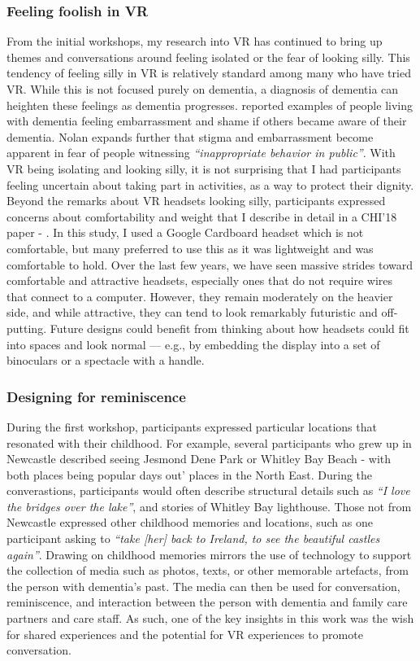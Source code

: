 \subsubsection{Feeling foolish in VR}
\label{S1:Foolish}
From the initial workshops, my research into VR has continued to bring up themes and conversations around feeling isolated or the fear of looking silly. This tendency of feeling silly in VR is relatively standard among many who have tried VR. While this is not focused purely on dementia, a diagnosis of dementia can heighten these feelings as dementia progresses. \cite{nolan_perceptions_2006} reported examples of people living with dementia feeling embarrassment and shame if others became aware of their dementia. Nolan expands further that stigma and embarrassment become apparent in fear of people witnessing \textit{``inappropriate behavior in public''}. With VR being isolating and looking silly, it is not surprising that I had participants feeling uncertain about taking part in activities, as a way to protect their dignity. Beyond the remarks about VR headsets looking silly, participants expressed concerns about comfortability and weight that I describe in detail in a CHI'18 paper - \citep{hodge_exploring_2018}. In this study, I used a Google Cardboard headset which is not comfortable, but many preferred to use this as it was lightweight and was comfortable to hold. Over the last few years, we have seen massive strides toward comfortable and attractive headsets, especially ones that do not require wires that connect to a computer. However, they remain moderately on the heavier side, and while attractive, they can tend to look remarkably futuristic and off-putting. Future designs could benefit from thinking about how headsets could fit into spaces and look normal — e.g., by embedding the display into a set of binoculars or a spectacle with a handle.

\subsubsection{Designing for reminiscence}
\label{ReminiscencevsMoment}
During the first workshop, participants expressed particular locations that resonated with their childhood. For example, several participants who grew up in Newcastle described seeing Jesmond Dene Park or Whitley Bay Beach - with both places being popular days out' places in the North East. During the converastions, participants would often describe structural details such as \textit{``I love the bridges over the lake''}, and stories of Whitley Bay lighthouse. Those not from Newcastle expressed other childhood memories and locations, such as one participant asking to \textit{``take [her] back to Ireland, to see the beautiful castles again''}. Drawing on childhood memories mirrors the use of technology to support the collection of media such as photos, texts, or other memorable artefacts, from the person with dementia's past. The media can then be used for conversation, reminiscence, and interaction between the person with dementia and family care partners and care staff. As such, one of the key insights in this work was the wish for shared experiences and the potential for VR experiences to promote conversation. 

